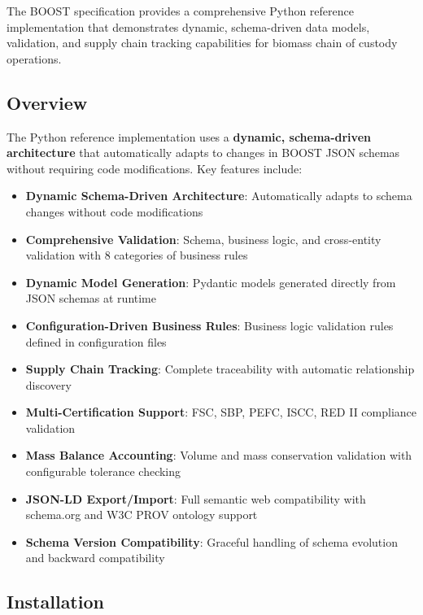 
The BOOST specification provides a comprehensive Python reference implementation that demonstrates dynamic, schema-driven data models, validation, and supply chain tracking capabilities for biomass chain of custody operations.

\subsection{Overview}
\label{sec:python-overview}

The Python reference implementation uses a \textbf{dynamic, schema-driven architecture} that automatically adapts to changes in BOOST JSON schemas without requiring code modifications. Key features include:

\begin{itemize}
    \item \textbf{Dynamic Schema-Driven Architecture}: Automatically adapts to schema changes without code modifications
    \item \textbf{Comprehensive Validation}: Schema, business logic, and cross-entity validation with 8 categories of business rules
    \item \textbf{Dynamic Model Generation}: Pydantic models generated directly from JSON schemas at runtime
    \item \textbf{Configuration-Driven Business Rules}: Business logic validation rules defined in configuration files
    \item \textbf{Supply Chain Tracking}: Complete traceability with automatic relationship discovery
    \item \textbf{Multi-Certification Support}: FSC, SBP, PEFC, ISCC, RED II compliance validation
    \item \textbf{Mass Balance Accounting}: Volume and mass conservation validation with configurable tolerance checking
    \item \textbf{JSON-LD Export/Import}: Full semantic web compatibility with schema.org and W3C PROV ontology support
    \item \textbf{Schema Version Compatibility}: Graceful handling of schema evolution and backward compatibility
\end{itemize}

\subsection{Installation}
\label{sec:python-installation}

